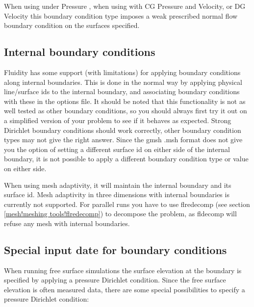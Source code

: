 When using  under Pressure , when using
 with CG Pressure and Velocity, or DG Velocity this boundary condition type
imposes a weak prescribed normal flow boundary condition on the surfaces specified.


\subsection{Internal boundary conditions}\label{sec:internal_bcs}
Fluidity has some support (with limitations) for applying boundary conditions
along internal boundaries. This is done in the normal way
by applying physical line/surface ids to the internal boundary, and associating
boundary conditions with these in the options file. It should be
noted that this functionality is not as well tested as other boundary
conditions, so you should always first try it out on a simplified version of
your problem to see if it behaves as expected. Strong Dirichlet boundary
conditions should work correctly, other boundary condition types may not give
the right answer. Since the gmsh .msh format does not give you the
option of setting a different surface id on either side of the internal
boundary, it is not possible to apply a different boundary condition type or
value on either side.

When using mesh adaptivity, it will maintain the internal boundary and its
surface id. Mesh adaptivity in three dimensions with internal boundaries
is currently not supported. For parallel runs you have to use flredecomp (see
section \ref{mesh!meshing tools!flredecomp}) to
decompose the problem, as fldecomp will refuse any mesh with internal boundaries.

\subsection{Special input date for boundary conditions}\label{sec:BCs:specialised}

When running free surface simulations the surface elevation at the boundary is specified by applying a pressure Dirichlet condition. Since the free surface elevation is often measured data, there are some special possibilities to specify a pressure Dirichlet condition:

